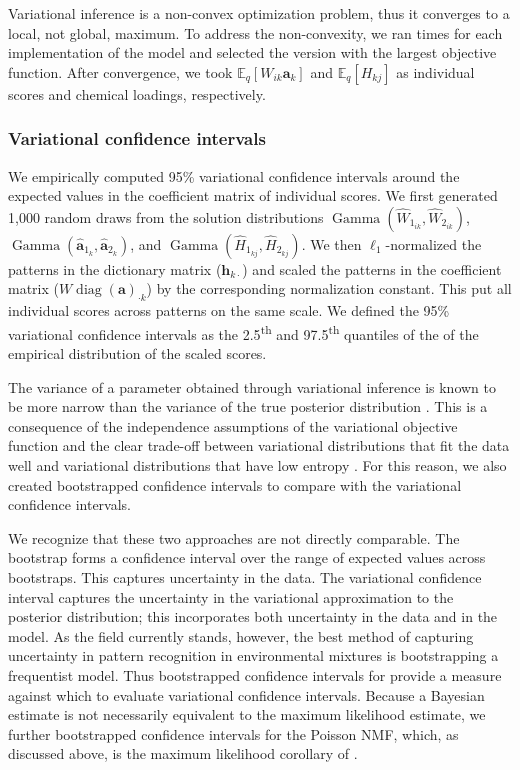 Variational inference is a non-convex optimization problem, thus it converges to a local, not global, maximum. To address the non-convexity, we ran  times for each implementation of the model and selected the version with the largest objective function. After convergence, we took $\mathbb{E}_{q}\left[W_{i k}\mathbf{a}_{k}\right]$ and $\mathbb{E}_{q}\left[H_{k j}\right]$ as individual scores and chemical loadings, respectively.

\subsubsection{Variational confidence intervals}
\label{methods_vci}
We empirically computed 95\% variational confidence intervals around the expected values in the coefficient matrix of individual scores. We first generated 1,000 random draws from the solution distributions $\operatorname{Gamma}(\hat{W}_{1_{i k}}, \hat{W}_{2_{i k}})$, $\operatorname{Gamma}(\hat{\mathbf{a}}_{1_k}, \hat{\mathbf{a}}_{2_k})$, and $\operatorname{Gamma}(\hat{H}_{1_{k j}}, \hat{H}_{2_{k j}})$. We then $\ell_1$-normalized the patterns in the dictionary matrix ($\mathbf{h}_{k \cdot}$) and scaled the patterns in the coefficient matrix ($W\operatorname{diag}(\mathbf{a})_{\cdot k}$) by the corresponding normalization constant. This put all individual scores across patterns on the same scale. We defined the 95\% variational confidence intervals as the 2.5\textsuperscript{th} and 97.5\textsuperscript{th} quantiles of the of the empirical distribution of the scaled scores.

The variance of a parameter obtained through variational inference is known to be more narrow than the variance of the true posterior distribution \cite{svensen2005robust}. This is a consequence of the independence assumptions of the variational objective function and the clear trade-off between variational distributions that fit the data well and variational distributions that have low entropy \cite{blei2017variational}. For this reason, we also created bootstrapped confidence intervals to compare with the variational confidence intervals. 

We recognize that these two approaches are not directly comparable. The bootstrap forms a confidence interval over the range of expected values across bootstraps. This captures uncertainty in the data. The variational confidence interval captures the uncertainty in the variational approximation to the posterior distribution; this incorporates both uncertainty in the data and in the model. As the field currently stands, however, the best method of capturing uncertainty in pattern recognition in environmental mixtures is bootstrapping a frequentist model. Thus bootstrapped confidence intervals for \bnmf provide a measure against which to evaluate variational confidence intervals. Because a Bayesian estimate is not necessarily equivalent to the maximum likelihood estimate, we further bootstrapped confidence intervals for the Poisson NMF, which, as discussed above, is the maximum likelihood corollary of \bnmfc.

